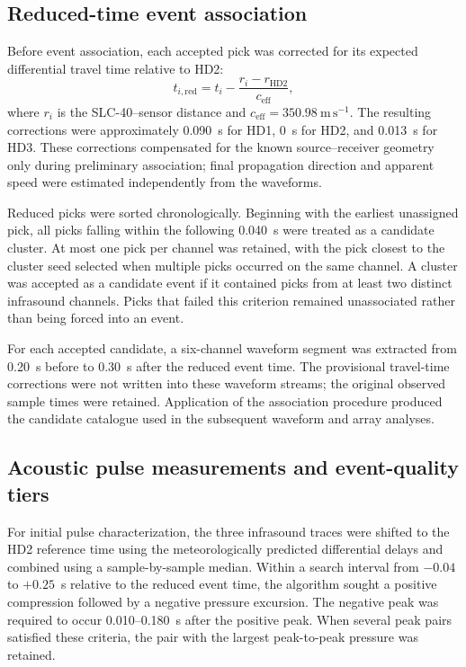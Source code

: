 \documentclass[]{seismica}
\begin{document}
\subsection{Reduced-time event association}

Before event association, each accepted pick was corrected for its expected differential travel time relative to HD2:
\begin{equation}
  t_{i,\mathrm{red}} = t_i - \frac{r_i-r_{\mathrm{HD2}}}{c_{\mathrm{eff}}},
  \label{eq:reduced_time}
\end{equation}
where $r_i$ is the SLC-40--sensor distance and $c_{\mathrm{eff}}=350.98~\mathrm{m\,s^{-1}}$. The resulting corrections were approximately 0.090~s for HD1, 0~s for HD2, and 0.013~s for HD3. These corrections compensated for the known source--receiver geometry only during preliminary association; final propagation direction and apparent speed were estimated independently from the waveforms.

Reduced picks were sorted chronologically. Beginning with the earliest unassigned pick, all picks falling within the following 0.040~s were treated as a candidate cluster. At most one pick per channel was retained, with the pick closest to the cluster seed selected when multiple picks occurred on the same channel. A cluster was accepted as a candidate event if it contained picks from at least two distinct infrasound channels. Picks that failed this criterion remained unassociated rather than being forced into an event.

For each accepted candidate, a six-channel waveform segment was extracted from 0.20~s before to 0.30~s after the reduced event time. The provisional travel-time corrections were not written into these waveform streams; the original observed sample times were retained. Application of the association procedure produced the candidate catalogue used in the subsequent waveform and array analyses.

\subsection{Acoustic pulse measurements and event-quality tiers}

For initial pulse characterization, the three infrasound traces were shifted to the HD2 reference time using the meteorologically predicted differential delays and combined using a sample-by-sample median. Within a search interval from $-0.04$ to $+0.25$~s relative to the reduced event time, the algorithm sought a positive compression followed by a negative pressure excursion. The negative peak was required to occur 0.010--0.180~s after the positive peak. When several peak pairs satisfied these criteria, the pair with the largest peak-to-peak pressure was retained.
\end{document}
